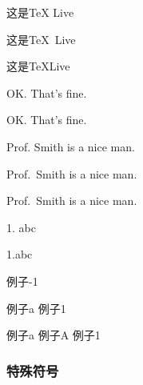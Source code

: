             这是\TeX{} Live %

            这是\TeX\ Live %

            这是\TeX\space Live %

            OK. That's fine. %

            OK\@. That's fine. %

            Prof. Smith is a nice man. %

            Prof.\ Smith is a nice man. 

            Prof.~Smith is a nice man.

            1. abc

            1.\frenchspacing abc

            例子-1

            例子a 例子1
            
            \mbox{例子}a 例子\mbox{A} \mbox{例子}\mbox{1}

        \subsubsection{特殊符号}